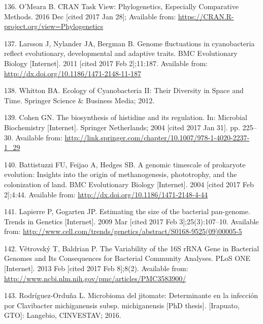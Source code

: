 \documentclass[12pt,twoside]{reedthesis}
\begin{document}
  \hypertarget{ref-omeara_cran_2016}{}
  136. O'Meara B. CRAN Task View: Phylogenetics, Especially Comparative
  Methods. 2016 Dec {[}cited 2017 Jan 28{]}; Available from:
  \url{https://CRAN.R-project.org/view=Phylogenetics}
  
  \hypertarget{ref-larsson_genome_2011}{}
  137. Larsson J, Nylander JA, Bergman B. Genome fluctuations in
  cyanobacteria reflect evolutionary, developmental and adaptive traits.
  BMC Evolutionary Biology {[}Internet{]}. 2011 {[}cited 2017 Feb
  2{]};11:187. Available from:
  \url{http://dx.doi.org/10.1186/1471-2148-11-187}
  
  \hypertarget{ref-whitton_ecology_2012}{}
  138. Whitton BA. Ecology of Cyanobacteria II: Their Diversity in Space
  and Time. Springer Science \& Business Media; 2012.
  
  \hypertarget{ref-cohen_biosynthesis_2004}{}
  139. Cohen GN. The biosynthesis of histidine and its regulation. In:
  Microbial Biochemistry {[}Internet{]}. Springer Netherlands; 2004
  {[}cited 2017 Jan 31{]}. pp. 225--30. Available from:
  \url{http://link.springer.com/chapter/10.1007/978-1-4020-2237-1_29}
  
  \hypertarget{ref-battistuzzi_genomic_2004}{}
  140. Battistuzzi FU, Feijao A, Hedges SB. A genomic timescale of
  prokaryote evolution: Insights into the origin of methanogenesis,
  phototrophy, and the colonization of land. BMC Evolutionary Biology
  {[}Internet{]}. 2004 {[}cited 2017 Feb 2{]};4:44. Available from:
  \url{http://dx.doi.org/10.1186/1471-2148-4-44}
  
  \hypertarget{ref-lapierre_estimating_2009}{}
  141. Lapierre P, Gogarten JP. Estimating the size of the bacterial
  pan-genome. Trends in Genetics {[}Internet{]}. 2009 Mar {[}cited 2017
  Feb 3{]};25(3):107--10. Available from:
  \url{http://www.cell.com/trends/genetics/abstract/S0168-9525(09)00005-5}
  
  \hypertarget{ref-vetrovsky_variability_2013}{}
  142. Větrovský T, Baldrian P. The Variability of the 16S rRNA Gene in
  Bacterial Genomes and Its Consequences for Bacterial Community Analyses.
  PLoS ONE {[}Internet{]}. 2013 Feb {[}cited 2017 Feb 8{]};8(2). Available
  from: \url{http://www.ncbi.nlm.nih.gov/pmc/articles/PMC3583900/}
  
  \hypertarget{ref-rodriguez_tesis_2016}{}
  143. Rodríguez-Orduña L. Microbioma del jitomate: Determinante en la
  infección por Clavibacter michiganensis subsp. michiganensis
  {[}PhD thesis{]}. {[}Irapuato, GTO{]}: Langebio, CINVESTAV; 2016.
  
\end{document}
